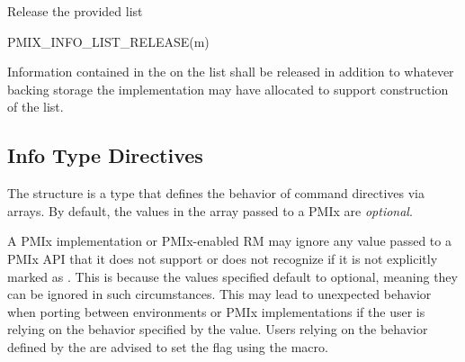 \begin{arglist}
\end{arglist}


Release the provided  list

\cspecificstart
\begin{codepar}
PMIX_INFO_LIST_RELEASE(m)
\end{codepar}
\cspecificend

\begin{arglist}
\end{arglist}

Information contained in the  on the list shall be released in addition to whatever backing storage the implementation may have allocated to support construction of the list.


\subsection{Info Type Directives}
\label{api:struct:infodirs}

The  structure is a  type that defines the behavior of command directives via  arrays.
By default, the values in the  array passed to a PMIx are \emph{optional}.

\adviceuserstart
A PMIx implementation or PMIx-enabled \ac{RM} may ignore any  value passed to a \ac{PMIx} \ac{API} that it does not support or does not recognize if it is not explicitly marked as .
This is because the values specified default to optional, meaning they can be ignored in such circumstances.
This may lead to unexpected behavior when porting between environments or \ac{PMIx} implementations if the user is relying on the behavior specified by the  value.
Users relying on the behavior defined by the  are advised to set the  flag using the  macro.
\adviceuserend

